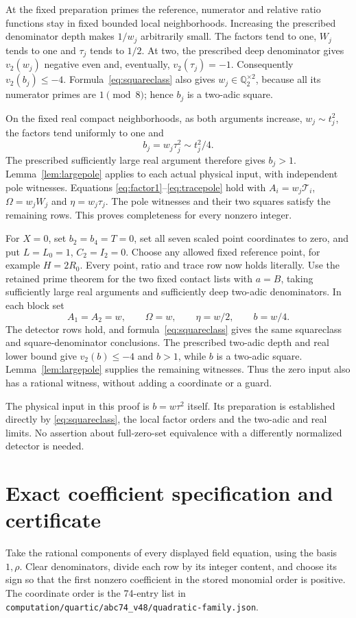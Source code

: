 \documentclass[11pt,a4paper]{article}
\newcommand{\Q}{\mathbb Q}\newcommand{\Z}{\mathbb Z}
\begin{document}
At the fixed preparation primes the reference, numerator and relative
ratio functions stay in fixed bounded local neighborhoods. Increasing
the prescribed denominator depth makes $1/w_j$ arbitrarily small.
The factors tend to one, $W_j$ tends to one and $\tau_j$ tends
to $1/2$. At two, the prescribed deep denominator gives
$v_2(w_j)$ negative even and, eventually, $v_2(\tau_j)=-1$.
Consequently $v_2(b_j)\le-4$. Formula~\eqref{eq:squareclass}
also gives $w_j\in\Q_2^{\times2}$, because all its numerator
primes are $1\pmod8$; hence $b_j$ is a two-adic square.

On the fixed real compact neighborhoods, as both arguments increase,
$w_j\sim t_j^2$, the factors tend uniformly to one and
\[
                          b_j=w_j\tau_j^2\sim t_j^2/4.
\]
The prescribed sufficiently large real argument therefore gives
$b_j>1$. Lemma~\ref{lem:largepole} applies to each actual physical
input, with independent pole witnesses. Equations
\eqref{eq:factor1}--\eqref{eq:tracepole} hold with
$A_i=w_j\mathcal T_i$, $\Omega=w_jW_j$ and $\eta=w_j\tau_j$.
The pole witnesses and their two squares satisfy the remaining rows.
This proves completeness for every nonzero integer.

For $X=0$, set $b_2=b_4=T=0$, set all seven scaled point
coordinates to zero, and put $L=L_0=1$, $C_2=I_2=0$.
Choose any allowed fixed reference point, for example $H=2R_0$.
Every point, ratio and trace row now holds literally.
Use the retained prime theorem for the two fixed contact lists with
$a=B$, taking sufficiently large real arguments and sufficiently deep
two-adic denominators. In each block set
\[
 A_1=A_2=w,\qquad \Omega=w,\qquad
 \eta=w/2,\qquad b=w/4.
\]
The detector rows hold, and formula~\eqref{eq:squareclass} gives
the same squareclass and square-denominator conclusions.
The prescribed two-adic depth and real lower bound give
$v_2(b)\le-4$ and $b>1$, while $b$ is a two-adic square.
Lemma~\ref{lem:largepole} supplies the remaining witnesses.
Thus the zero input also has a rational witness, without adding a
coordinate or a guard.

The physical input in this proof is $b=w\tau^2$ itself.
Its preparation is established directly by
\eqref{eq:squareclass}, the local factor orders and the two-adic and
real limits. No assertion about full-zero-set equivalence with
a differently normalized detector is needed.

\section{Exact coefficient specification and certificate}
Take the rational components of every displayed field equation,
using the basis $1,\rho$. Clear denominators, divide each row by its
integer content, and choose its sign so that the first nonzero
coefficient in the stored monomial order is positive. The coordinate
order is the 74-entry list in
\nolinkurl{computation/quartic/abc74_v48/quadratic-family.json}.
\end{document}

